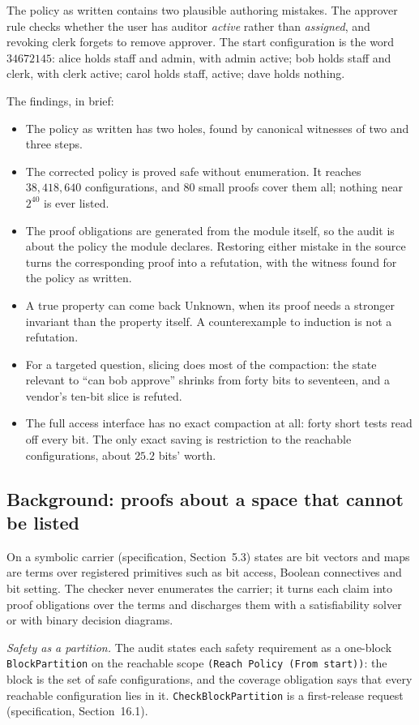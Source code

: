 \documentclass[11pt]{article}
\newcommand{\code}[1]{\texttt{#1}}
\newcommand{\spec}[1]{specification, Section~#1}
\theoremstyle{definition}
\theoremstyle{plain}
\begin{document}
The policy as written contains two plausible authoring mistakes. The approver rule checks whether
the user has auditor \emph{active} rather than \emph{assigned}, and revoking clerk forgets to remove
approver. The start configuration is the word $34672145$: alice holds staff and admin, with admin
active; bob holds staff and clerk, with clerk active; carol holds staff, active; dave holds nothing.

The findings, in brief:
\begin{itemize}
\item The policy as written has two holes, found by canonical witnesses of two and three steps.
\item The corrected policy is proved safe without enumeration. It reaches $38{,}418{,}640$
configurations, and $80$ small proofs cover them all; nothing near $2^{40}$ is ever listed.
\item The proof obligations are generated from the module itself, so the audit is about the policy
the module declares. Restoring either mistake in the source turns the corresponding proof into a
refutation, with the witness found for the policy as written.
\item A true property can come back Unknown, when its proof needs a stronger invariant than the
property itself. A counterexample to induction is not a refutation.
\item For a targeted question, slicing does most of the compaction: the state relevant to ``can bob
approve'' shrinks from forty bits to seventeen, and a vendor's ten-bit slice is refuted.
\item The full access interface has no exact compaction at all: forty short tests read off every
bit. The only exact saving is restriction to the reachable configurations, about $25.2$ bits'
worth.
\end{itemize}

\subsection{Background: proofs about a space that cannot be listed}

On a symbolic carrier (\spec{5.3}) states are bit vectors and maps are terms over registered
primitives such as bit access, Boolean connectives and bit setting. The checker never enumerates the
carrier; it turns each claim into proof obligations over the terms and discharges them with a
satisfiability solver or with binary decision diagrams.

\emph{Safety as a partition.} The audit states each safety requirement as a one-block
\code{BlockPartition} on the reachable scope \code{(Reach Policy (From start))}: the block is the set
of safe configurations, and the coverage obligation says that every reachable configuration lies in
it. \code{CheckBlockPartition} is a first-release request (\spec{16.1}).
\end{document}
